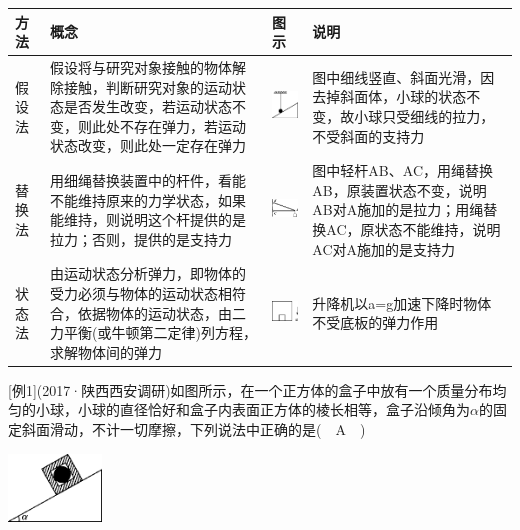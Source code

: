 \documentclass[cn,10.5pt,chinese,mac,chinesefont=founder]{elegantbook}
\begin{document}
\begin{longtable}[]{@{}m{0.2cm}m{6.1cm}m{2cm}m{5cm}@{}}
\toprule

方法& 概念& 图示&说明 \tabularnewline
\midrule
假
设
法& 假设将与研究对象接触的物体解除接触，判断研究对象的运动状态是否发生改变，若运动状态不变，则此处不存在弹力，若运动状态改变，则此处一定存在弹力  &
\begin{center}\includegraphics[width=0.55208in,height=0.55208in]{media/image40.png}\end{center}&
图中细线竖直、斜面光滑，因去掉斜面体，小球的状态不变，故小球只受细线的拉力，不受斜面的支持力\tabularnewline

替
换
法 & 用细绳替换装置中的杆件，看能不能维持原来的力学状态，如果能维持，则说明这个杆提供的是拉力；否则，提供的是支持力&
\begin{center}\includegraphics[width=0.82292in,height=0.58333in]{media/image41.png}\end{center}&
图中轻杆AB、AC，用绳替换AB，原装置状态不变，说明AB对A施加的是拉力；用绳替换AC，原状态不能维持，说明AC对A施加的是支持力\strut
\tabularnewline
状
态
法 & 由运动状态分析弹力，即物体的受力必须与物体的运动状态相符合，依据物体的运动状态，由二力平衡(或牛顿第二定律)列方程，求解物体间的弹力 &
\begin{center}\includegraphics[width=0.55208in,height=0.42708in]{media/image42.png}\end{center}&
升降机以a=g加速下降时物体不受底板的弹力作用\tabularnewline
\bottomrule
\end{longtable}

{[}例1{]}(2017·陕西西安调研)如图所示，在一个正方体的盒子中放有一个质量分布均匀的小球，小球的直径恰好和盒子内表面正方体的棱长相等，盒子沿倾角为$\alpha$的固定斜面滑动，不计一切摩擦，下列说法中正确的是(　A　)

\begin{center}\includegraphics[width=0.97917in,height=0.70833in]{media/image43.png}\end{center}
\end{document}
